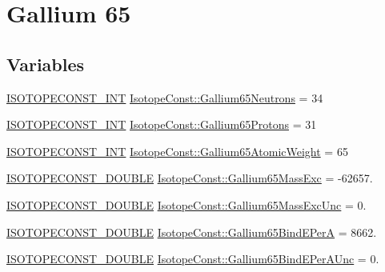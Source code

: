 \hypertarget{group___isotope_const-_gallium-_ga65}{}\section{Gallium 65}
\label{group___isotope_const-_gallium-_ga65}
\subsection*{Variables}
\begin{DoxyCompactItemize}
\item 
\mbox{\hyperlink{group___isotope_const-_macros_ga5f18360b3e99483a35c32d789e62621c}{I\+S\+O\+T\+O\+P\+E\+C\+O\+N\+S\+T\+\_\+\+I\+NT}} \mbox{\hyperlink{group___isotope_const-_gallium-_ga65_ga2f73ea26996a3adab14ac84d05bc4aab}{Isotope\+Const\+::\+Gallium65\+Neutrons}} = 34
\item 
\mbox{\hyperlink{group___isotope_const-_macros_ga5f18360b3e99483a35c32d789e62621c}{I\+S\+O\+T\+O\+P\+E\+C\+O\+N\+S\+T\+\_\+\+I\+NT}} \mbox{\hyperlink{group___isotope_const-_gallium-_ga65_gaae47d9f0ae76ad67304a8da63d361284}{Isotope\+Const\+::\+Gallium65\+Protons}} = 31
\item 
\mbox{\hyperlink{group___isotope_const-_macros_ga5f18360b3e99483a35c32d789e62621c}{I\+S\+O\+T\+O\+P\+E\+C\+O\+N\+S\+T\+\_\+\+I\+NT}} \mbox{\hyperlink{group___isotope_const-_gallium-_ga65_ga9e7add866225e4d2f38745afddb36105}{Isotope\+Const\+::\+Gallium65\+Atomic\+Weight}} = 65
\item 
\mbox{\hyperlink{group___isotope_const-_macros_ga8f45a7272ce02c0b4c65c44636ed719a}{I\+S\+O\+T\+O\+P\+E\+C\+O\+N\+S\+T\+\_\+\+D\+O\+U\+B\+LE}} \mbox{\hyperlink{group___isotope_const-_gallium-_ga65_ga7cbbf872f9896bb955f3effd20b885c6}{Isotope\+Const\+::\+Gallium65\+Mass\+Exc}} = -\/62657.
\item 
\mbox{\hyperlink{group___isotope_const-_macros_ga8f45a7272ce02c0b4c65c44636ed719a}{I\+S\+O\+T\+O\+P\+E\+C\+O\+N\+S\+T\+\_\+\+D\+O\+U\+B\+LE}} \mbox{\hyperlink{group___isotope_const-_gallium-_ga65_ga79a99587dcdb5b0eb23fb31cffe18bfd}{Isotope\+Const\+::\+Gallium65\+Mass\+Exc\+Unc}} = 0.
\item 
\mbox{\hyperlink{group___isotope_const-_macros_ga8f45a7272ce02c0b4c65c44636ed719a}{I\+S\+O\+T\+O\+P\+E\+C\+O\+N\+S\+T\+\_\+\+D\+O\+U\+B\+LE}} \mbox{\hyperlink{group___isotope_const-_gallium-_ga65_gab2c39b09ee20eac63a8972c81c6a14fe}{Isotope\+Const\+::\+Gallium65\+Bind\+E\+PerA}} = 8662.
\item 
\mbox{\hyperlink{group___isotope_const-_macros_ga8f45a7272ce02c0b4c65c44636ed719a}{I\+S\+O\+T\+O\+P\+E\+C\+O\+N\+S\+T\+\_\+\+D\+O\+U\+B\+LE}} \mbox{\hyperlink{group___isotope_const-_gallium-_ga65_ga072f4e5b2d2b4ead64bb5e3b474438e5}{Isotope\+Const\+::\+Gallium65\+Bind\+E\+Per\+A\+Unc}} = 0.

\end{DoxyCompactItemize}
